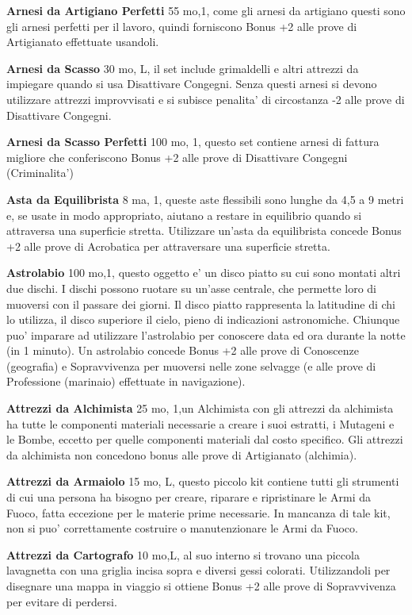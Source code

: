 \documentclass[a4paper,11pt,twoside,openany]{book}
\begin{document}
{\textbf{Arnesi da Artigiano Perfetti} 55 mo,1, come gli arnesi da artigiano questi sono gli arnesi perfetti per il lavoro, quindi forniscono Bonus +2 alle prove di Artigianato effettuate usandoli.

\textbf{Arnesi da Scasso} 30 mo, L, il set include grimaldelli e altri attrezzi da impiegare quando si usa Disattivare Congegni. Senza questi arnesi si devono utilizzare attrezzi improvvisati e si subisce penalita' di circostanza -2 alle prove di Disattivare Congegni.

\textbf{Arnesi da Scasso Perfetti} 100 mo, 1, questo set contiene arnesi di fattura migliore che conferiscono Bonus +2 alle prove di Disattivare Congegni (Criminalita')

\textbf{Asta da Equilibrista} 8 ma, 1, queste aste flessibili sono lunghe da 4,5 a 9 metri e, se usate in modo appropriato, aiutano a restare in equilibrio quando si attraversa una superficie stretta. Utilizzare un'asta da equilibrista concede Bonus +2 alle prove di Acrobatica per attraversare una superficie stretta.

\textbf{Astrolabio} 100 mo,1,  questo oggetto e' un disco piatto su cui sono montati altri due dischi. I dischi possono ruotare su un'asse centrale, che permette loro di muoversi con il passare dei giorni. Il disco piatto rappresenta la latitudine di chi lo utilizza, il disco superiore il cielo, pieno di indicazioni astronomiche.
Chiunque puo' imparare ad utilizzare l'astrolabio per conoscere data ed ora durante la notte (in 1 minuto). Un astrolabio concede Bonus +2 alle prove di Conoscenze (geografia) e Sopravvivenza per muoversi nelle zone selvagge (e alle prove di Professione (marinaio) effettuate in navigazione).

\textbf{Attrezzi da Alchimista} 25 mo, 1,un Alchimista con gli attrezzi da alchimista ha tutte le componenti materiali necessarie a creare i suoi estratti, i Mutageni e le Bombe, eccetto per quelle componenti materiali dal costo specifico. Gli attrezzi da alchimista non concedono bonus alle prove di Artigianato (alchimia).

\textbf{Attrezzi da Armaiolo} 15 mo, L, questo piccolo kit contiene tutti gli strumenti di cui una persona ha bisogno per creare, riparare e ripristinare le Armi da Fuoco, fatta eccezione per le materie prime necessarie. In mancanza di tale kit, non si puo' correttamente costruire o manutenzionare le Armi da Fuoco.

\textbf{Attrezzi da Cartografo} 10 mo,L, al suo interno si trovano una piccola lavagnetta con una griglia incisa sopra e diversi gessi colorati. Utilizzandoli per disegnare una mappa in viaggio si ottiene Bonus +2 alle prove di Sopravvivenza per evitare di perdersi.

}
\end{document}
